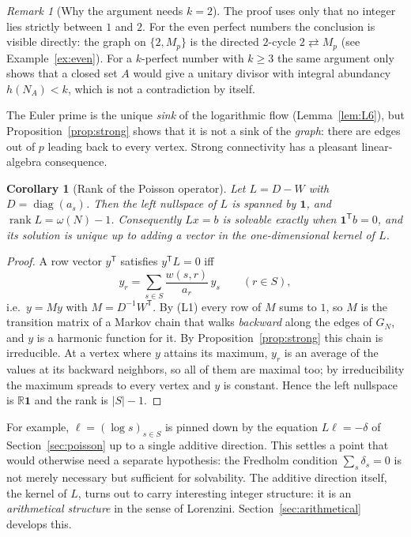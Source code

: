 \documentclass[11pt]{article}
\newtheorem{corollary}[theorem]{Corollary}
\theoremstyle{definition}
\theoremstyle{remark}
\newtheorem{remark}[theorem]{Remark}
\newcommand{\one}{\mathbf{1}}
\begin{document}
\begin{remark}[Why the argument needs $k=2$]
The proof uses only that no integer lies strictly between $1$ and $2$.  For
the even perfect numbers the conclusion is visible directly: the graph on
$\{2,M_p\}$ is the directed $2$-cycle $2\rightleftarrows M_p$ (see
Example~\ref{ex:even}).  For a $k$-perfect number with $k\ge3$ the
same argument only shows that a closed set $A$ would give a unitary divisor
with integral abundancy $h(N_A)<k$, which is not a contradiction by itself.
\end{remark}

The Euler prime is the unique \emph{sink} of the logarithmic flow
(Lemma~\ref{lem:L6}), but Proposition~\ref{prop:strong} shows that it is not
a sink of the \emph{graph}: there are edges out of $p$ leading back to every
vertex.  Strong connectivity has a pleasant linear-algebra consequence.

\begin{corollary}[Rank of the Poisson operator]\label{cor:rank}
Let $L=D-W$ with $D=\operatorname{diag}(a_s)$.  Then the left nullspace of
$L$ is spanned by $\one$, and $\operatorname{rank}L=\omega(N)-1$.
Consequently $Lx=b$ is solvable exactly when $\one^{\mathsf T}b=0$, and its
solution is unique up to adding a vector in the one-dimensional kernel of $L$.
\end{corollary}

\begin{proof}
A row vector $y^{\mathsf T}$ satisfies $y^{\mathsf T}L=0$ iff
\[
y_r=\sum_{s\in S}\frac{w(s,r)}{a_r}\,y_s\qquad(r\in S),
\]
i.e.\ $y=My$ with $M=D^{-1}W^{\mathsf T}$.  By (L1) every row of $M$ sums to
$1$, so $M$ is the transition matrix of a Markov chain that walks
\emph{backward} along the edges of $G_N$, and $y$ is a harmonic function for
it.  By Proposition~\ref{prop:strong} this chain is irreducible.  At a vertex
where $y$ attains its maximum, $y_r$ is an average of the values at its
backward neighbors, so all of them are maximal too; by irreducibility the
maximum spreads to every vertex and $y$ is constant.  Hence the left
nullspace is $\mathbb R\one$ and the rank is $|S|-1$.
\end{proof}

For example, $\ell=(\log s)_{s\in S}$ is pinned down by the equation
$L\ell=-\delta$ of Section~\ref{sec:poisson} up to a single additive direction.  This settles a
point that would otherwise need a separate hypothesis: the Fredholm condition
$\sum_s\delta_s=0$ is not merely necessary but sufficient for solvability.
The additive direction itself, the kernel of $L$, turns out to carry
interesting integer structure: it is an \emph{arithmetical structure} in the
sense of Lorenzini.  Section~\ref{sec:arithmetical} develops this.
\end{document}
